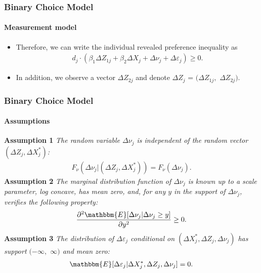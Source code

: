 \documentclass[notes=show]{beamer}
\begin{document}
\begin{frame}
\frametitle{Binary Choice Model}
\framesubtitle{Measurement model}

\begin{itemize}
	\item Therefore, we can write the individual revealed preference inequality as
	\begin{align*}
	d_{j} \cdot (\beta_{1}\Delta Z_{1j}+\beta_{2}\Delta X_{j}+\Delta\nu_{j}+\Delta\varepsilon_{j})\geq 0.
	\end{align*}
	\item In addition, we observe a vector $\Delta Z_{2j}$ and denote $\Delta Z_{j}$ = $(\Delta Z_{1j},$ $\Delta Z_{2j})$.
\end{itemize}
\end{frame}
\begin{frame}
\frametitle{Binary Choice Model}
\framesubtitle{Assumptions}

\textbf{Assumption 1} \textit{The random variable $\Delta\nu_{j}$ is independent of the random vector $(\Delta Z_{j},\Delta X^{*}_{j})$: 
\begin{align*}
F_{\nu}(\Delta\nu_{j}|(\Delta Z_{j},\Delta X^{*}_{j}))=F_{\nu}(\Delta\nu_{j}).
\end{align*}}
\textbf{Assumption 2} \textit{The marginal distribution function of $\Delta\nu_{j}$ is known up to a scale parameter, log concave, has mean zero, and, for any $y$ in the support of $\Delta\nu_{j}$, verifies the following property:
\begin{align*}
\frac{\partial^{2}\mathbbm{E}[\Delta\nu_{j}|\Delta\nu_{j}\geq y]}{\partial y^{2}}\geq 0.
\end{align*}}
\textbf{Assumption 3} \textit{The distribution of $\Delta\varepsilon_{j}$ conditional on $(\Delta X^{*}_{j},\Delta Z_{j},\Delta \nu_{j})$ has support $(-\infty,$ $\infty)$ and mean zero:
\begin{align*}
\mathbbm{E}[\Delta\varepsilon_{j}|\Delta X^{*}_{j},\Delta Z_{j},\Delta\nu_{j}]=0.
\end{align*}}
\end{frame}
\end{document}
